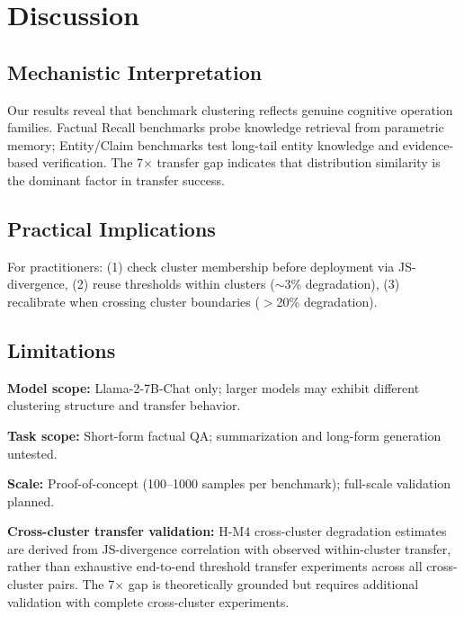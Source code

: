\section{Discussion}

\subsection{Mechanistic Interpretation}

Our results reveal that benchmark clustering reflects genuine cognitive operation families. Factual Recall benchmarks probe knowledge retrieval from parametric memory; Entity/Claim benchmarks test long-tail entity knowledge and evidence-based verification. The 7$\times$ transfer gap indicates that distribution similarity is the dominant factor in transfer success.

\subsection{Practical Implications}

For practitioners: (1) check cluster membership before deployment via JS-divergence, (2) reuse thresholds within clusters ($\sim$3\% degradation), (3) recalibrate when crossing cluster boundaries ($>$20\% degradation).

\subsection{Limitations}

\textbf{Model scope:} Llama-2-7B-Chat only; larger models may exhibit different clustering structure and transfer behavior.

\textbf{Task scope:} Short-form factual QA; summarization and long-form generation untested.

\textbf{Scale:} Proof-of-concept (100--1000 samples per benchmark); full-scale validation planned.

\textbf{Cross-cluster transfer validation:} H-M4 cross-cluster degradation estimates are derived from JS-divergence correlation with observed within-cluster transfer, rather than exhaustive end-to-end threshold transfer experiments across all cross-cluster pairs. The 7$\times$ gap is theoretically grounded but requires additional validation with complete cross-cluster experiments.
